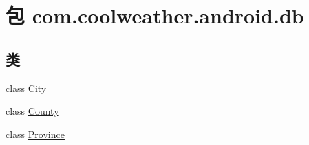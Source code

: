 \hypertarget{namespacecom_1_1coolweather_1_1android_1_1db}{}\section{包 com.\+coolweather.\+android.\+db}
\label{namespacecom_1_1coolweather_1_1android_1_1db}
\subsection*{类}
\begin{DoxyCompactItemize}
\item 
class \mbox{\hyperlink{classcom_1_1coolweather_1_1android_1_1db_1_1_city}{City}}
\item 
class \mbox{\hyperlink{classcom_1_1coolweather_1_1android_1_1db_1_1_county}{County}}
\item 
class \mbox{\hyperlink{classcom_1_1coolweather_1_1android_1_1db_1_1_province}{Province}}
\end{DoxyCompactItemize}
